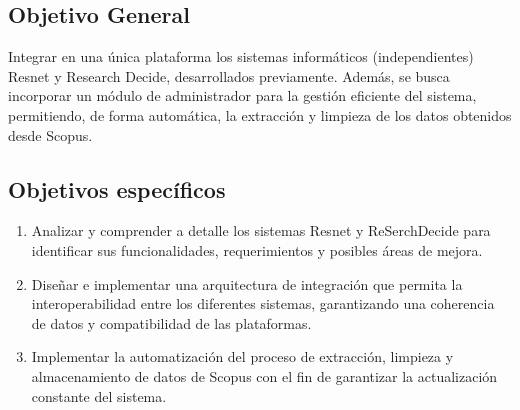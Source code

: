 \subsection{Objetivo General}
Integrar en una única plataforma los sistemas informáticos (independientes) Resnet y Research Decide, desarrollados previamente. Además, se busca incorporar un módulo de administrador para la gestión eficiente del sistema, permitiendo, de forma automática, la extracción y limpieza de los datos obtenidos desde Scopus.

\subsection{Objetivos específicos}
\begin{enumerate}
    \item Analizar y comprender a detalle los sistemas Resnet y ReSerchDecide para identificar sus funcionalidades, requerimientos y posibles áreas de mejora. 
    \item Diseñar e implementar una arquitectura de integración que permita la interoperabilidad entre los diferentes sistemas, garantizando una coherencia de datos y compatibilidad de las plataformas. 
    \item Implementar la automatización del proceso de extracción, limpieza y almacenamiento de datos de Scopus con el fin de garantizar la actualización constante del sistema. 
\end{enumerate}